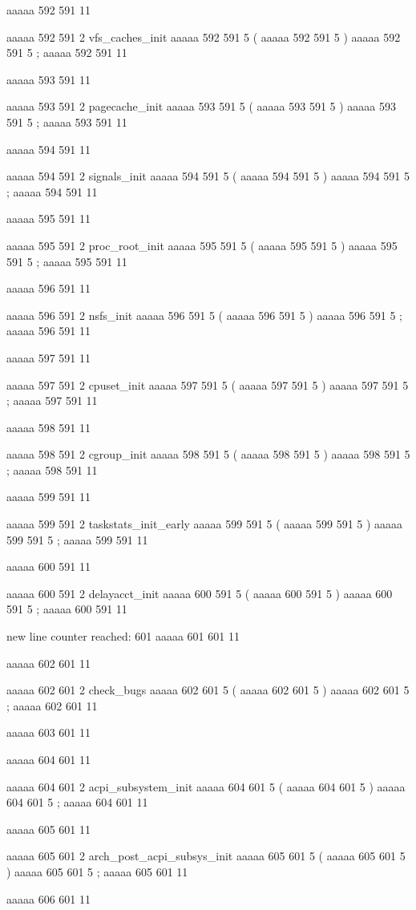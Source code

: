 {aaaaa 592 591
11
	
aaaaa 592 591
2
vfs_caches_init
aaaaa 592 591
5
(
aaaaa 592 591
5
)
aaaaa 592 591
5
;
aaaaa 592 591
11


aaaaa 593 591
11
	
aaaaa 593 591
2
pagecache_init
aaaaa 593 591
5
(
aaaaa 593 591
5
)
aaaaa 593 591
5
;
aaaaa 593 591
11


aaaaa 594 591
11
	
aaaaa 594 591
2
signals_init
aaaaa 594 591
5
(
aaaaa 594 591
5
)
aaaaa 594 591
5
;
aaaaa 594 591
11


aaaaa 595 591
11
	
aaaaa 595 591
2
proc_root_init
aaaaa 595 591
5
(
aaaaa 595 591
5
)
aaaaa 595 591
5
;
aaaaa 595 591
11


aaaaa 596 591
11
	
aaaaa 596 591
2
nsfs_init
aaaaa 596 591
5
(
aaaaa 596 591
5
)
aaaaa 596 591
5
;
aaaaa 596 591
11


aaaaa 597 591
11
	
aaaaa 597 591
2
cpuset_init
aaaaa 597 591
5
(
aaaaa 597 591
5
)
aaaaa 597 591
5
;
aaaaa 597 591
11


aaaaa 598 591
11
	
aaaaa 598 591
2
cgroup_init
aaaaa 598 591
5
(
aaaaa 598 591
5
)
aaaaa 598 591
5
;
aaaaa 598 591
11


aaaaa 599 591
11
	
aaaaa 599 591
2
taskstats_init_early
aaaaa 599 591
5
(
aaaaa 599 591
5
)
aaaaa 599 591
5
;
aaaaa 599 591
11


aaaaa 600 591
11
	
aaaaa 600 591
2
delayacct_init
aaaaa 600 591
5
(
aaaaa 600 591
5
)
aaaaa 600 591
5
;
aaaaa 600 591
11


new line counter reached: 601
aaaaa 601 601
11


aaaaa 602 601
11
	
aaaaa 602 601
2
check_bugs
aaaaa 602 601
5
(
aaaaa 602 601
5
)
aaaaa 602 601
5
;
aaaaa 602 601
11


aaaaa 603 601
11


aaaaa 604 601
11
	
aaaaa 604 601
2
acpi_subsystem_init
aaaaa 604 601
5
(
aaaaa 604 601
5
)
aaaaa 604 601
5
;
aaaaa 604 601
11


aaaaa 605 601
11
	
aaaaa 605 601
2
arch_post_acpi_subsys_init
aaaaa 605 601
5
(
aaaaa 605 601
5
)
aaaaa 605 601
5
;
aaaaa 605 601
11


aaaaa 606 601
11
	
}
